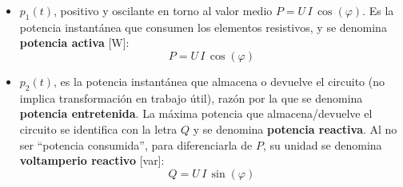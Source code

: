	\begin{itemize}
        \item $p_1(t)$, positivo y oscilante en torno al valor medio
          $P=U\,I\,\cos(\varphi)$. Es la potencia instantánea que
          consumen los elementos resistivos, y se denomina
          \textbf{potencia activa} [W]:
          \begin{equation}
            \boxed{P=U\,I\,\cos(\varphi)}
          \end{equation}
        \item $p_2(t)$, es la potencia instantánea que almacena o
          devuelve el circuito (no implica transformación en trabajo
          útil), razón por la que se denomina \textbf{potencia
            entretenida}. La máxima potencia que almacena/devuelve el
          circuito se identifica con la letra $Q$ y se denomina
          \textbf{potencia reactiva}. Al no ser ``potencia
          consumida'', para diferenciarla de $P$, su unidad se
          denomina \textbf{voltamperio reactivo} [var]:
          \begin{equation}
            \boxed{Q=U\,I\,\sin(\varphi)}
          \end{equation}
	\end{itemize}
	
